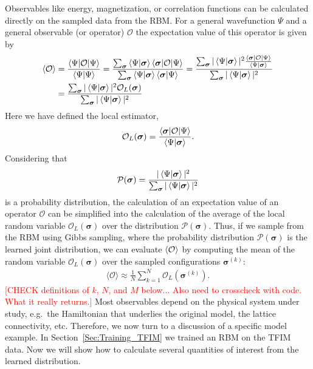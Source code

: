 \documentclass[submission, Phys]{SciPost}
\begin{document}
Observables like energy, magnetization, or correlation functions can be calculated directly on the sampled data from the RBM.
For a general wavefunction $\Psi$ and a general observable (or operator) $\mathcal{O}$ the expectation value of this operator is given by
\begin{align}
	\braket{\mathcal{O}} & = \frac{\braket{\Psi | \mathcal{O} | \Psi}}{\braket{\Psi | \Psi}} = \frac{\sum_{\bm{\sigma}} \braket{\Psi | {\bm{\sigma}}} \braket{{\bm{\sigma}} | \mathcal{O} | \Psi}}{\sum_{\bm{\sigma}} \braket{\Psi | {\bm{\sigma}}} \braket{{\bm{\sigma}} | \Psi}} = \frac{\sum_{\bm{\sigma}} | \braket{\Psi | {\bm{\sigma}}} |^2 \frac{\braket{{\bm{\sigma}} | \mathcal{O} | \Psi}}{\braket{\Psi | {\bm{\sigma}}}} }{\sum_{\bm{\sigma}} | \braket{\Psi | {\bm{\sigma}}} |^2} \\
	                     & = \frac{\sum_{\bm{\sigma}} | \braket{\Psi | {\bm{\sigma}}} |^2 \mathcal{O}_L({\bm{\sigma}}) }{\sum_{\bm{\sigma}} | \braket{\Psi | {\bm{\sigma}}} |^2}
\end{align}
Here we have defined the local estimator,
\begin{equation}
	\mathcal{O}_L({\bm{\sigma}}) = \frac{\braket{{\bm{\sigma}} | \mathcal{O} | \Psi}}{\braket{\Psi | {\bm{\sigma}}}} .
\end{equation}
Considering that
\begin{equation}
	\mathcal{P}({\bm{\sigma}}) = \frac{ | \braket{\Psi | {\bm{\sigma}}} |^2 }{\sum_{\bm{\sigma}} | \braket{\Psi | {\bm{\sigma}}} |^2}
\end{equation}
is a probability distribution, the calculation of an expectation value of an operator $\mathcal{O}$ can be simplified
into the calculation of the average of the local random variable $\mathcal{O}_L({\bm{\sigma}})$ over the distribution $\mathcal{P}({\bm{\sigma}})$.
Thus, if we sample from the RBM using Gibbs sampling, where the probability distribution $\mathcal{P}({\bm{\sigma}})$ is the learned joint distribution,
we can evaluate $\braket{\mathcal{O}}$ by computing the mean of the random variable $\mathcal{O}_L({\bm{\sigma}})$ over the
sampled configurations ${\bm{\sigma}^{(k)}}$:
\begin{align}
	\label{Eq:}
	\mathcal{\langle O \rangle} \approx \frac{1}{N} \sum_{k=1}^N \mathcal{O}_L({\bm{\sigma}}^{(k)}).
\end{align}
\textcolor{red}{[CHECK definitions of $k$, $N$, and $M$ below... Also need to crosscheck with code. What it really returns.]}
Most observables depend on the physical system under study, e.g.~the Hamiltonian that underlies the original model, the lattice connectivity, etc.
Therefore, we now turn to a discussion of a specific model example. In Section~\ref{Sec:Training_TFIM} we trained an RBM on the TFIM data.
Now we will show how to calculate several quantities of interest from the learned distribution.
\end{document}
